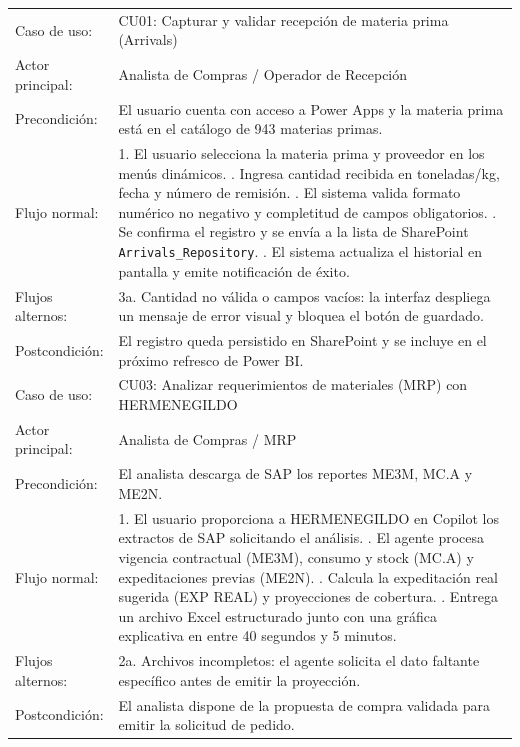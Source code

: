 \begin{longtable}{@{}L{3.2cm}L{12.2cm}@{}}
  Caso de uso: & CU01: Capturar y validar recepción de materia prima (Arrivals) \\
  Actor principal: & Analista de Compras / Operador de Recepción \\
  Precondición: & El usuario cuenta con acceso a Power Apps y la materia prima está en el catálogo de 943 materias primas. \\
  Flujo normal: & 1. El usuario selecciona la materia prima y proveedor en los menús dinámicos. . Ingresa cantidad recibida en toneladas/kg, fecha y número de remisión. . El sistema valida formato numérico no negativo y completitud de campos obligatorios. . Se confirma el registro y se envía a la lista de SharePoint \texttt{Arrivals\_Repository}. . El sistema actualiza el historial en pantalla y emite notificación de éxito. \\
  Flujos alternos: & 3a. Cantidad no válida o campos vacíos: la interfaz despliega un mensaje de error visual y bloquea el botón de guardado. \\
  Postcondición: & El registro queda persistido en SharePoint y se incluye en el próximo refresco de Power BI. \\
  \midrule
  Caso de uso: & CU03: Analizar requerimientos de materiales (MRP) con HERMENEGILDO \\
  Actor principal: & Analista de Compras / MRP \\
  Precondición: & El analista descarga de SAP los reportes ME3M, MC.A y ME2N. \\
  Flujo normal: & 1. El usuario proporciona a HERMENEGILDO en Copilot los extractos de SAP solicitando el análisis. . El agente procesa vigencia contractual (ME3M), consumo y stock (MC.A) y expeditaciones previas (ME2N). . Calcula la expeditación real sugerida (EXP REAL) y proyecciones de cobertura. . Entrega un archivo Excel estructurado junto con una gráfica explicativa en entre 40 segundos y 5 minutos. \\
  Flujos alternos: & 2a. Archivos incompletos: el agente solicita el dato faltante específico antes de emitir la proyección. \\
  Postcondición: & El analista dispone de la propuesta de compra validada para emitir la solicitud de pedido. \\

\end{longtable}
